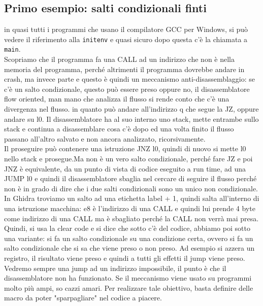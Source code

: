 \documentclass[12pt, oneside]{extbook}
\begin{document}
\subsection{Primo esempio: salti condizionali finti}
in quasi tutti i programmi che usano il compilatore GCC per Windows, si può vedere il riferimento alla \texttt{initenv} e quasi sicuro dopo questa c'è la chiamata a \texttt{main}.\\Scopriamo che il programma fa una CALL ad un indirizzo che non è nella memoria del programma, perché altrimenti il programma dovrebbe andare in crash, ma invece parte e questo è quindi un meccanismo anti-disassemblaggio: se c'è un salto condizionale, questo può essere preso oppure no, il disassemblatore flow oriented, man mano che analizza il flusso si rende conto che c'è una divergenza nel flusso. in quanto può andare all'indirizzo q che segue la JZ, oppure andare su l0. Il disassemblatore ha al suo interno uno stack, mette entrambe sullo stack e continua a disassemblare cosa c'è dopo ed una volta finito il flusso passano all'altro salvato e non ancora analizzato, ricorsivamente.\\Il proseguire può contenere una istruzione JNZ l0, quindi di nuovo si mette l0 nello stack e prosegue.Ma non è un vero salto condizionale, perché fare JZ e poi JNZ è equivalente, da un punto di vista di codice eseguito a run time, ad una JUMP l0 e quindi il disassemblatore sbaglia nel cercare di seguire il flusso perché non è in grado di dire che i due salti condizionali sono un unico non condizionale.\\In Ghidra troviamo un salto ad una etichetta label + 1, quindi salta all'interno di una istruzione macchina: e8 è l'indirizzo di una CALL e quindi lui prende 4 byte come indirizzo di una CALL ma è sbagliato perché la CALL non verrà mai presa. Quindi, si usa la clear code e si dice che sotto c'è del codice, abbiamo poi sotto una variante: si fa un salto condizionale su una condizione certa, ovvero si fa un salto condizionale che si sa che viene preso o non preso. Ad esempio si azzera un registro, il risultato viene preso e quindi a tutti gli effetti il jump viene preso.\\Vedremo sempre una jump ad un indirizzo impossibile, il punto è che il disassemblatore non ha funzionato. Se il meccanismo viene usato su programmi molto più ampi, so cazzi amari. Per realizzare tale obiettivo, basta definire delle macro da poter "sparpagliare" nel codice a piacere.
\end{document}
